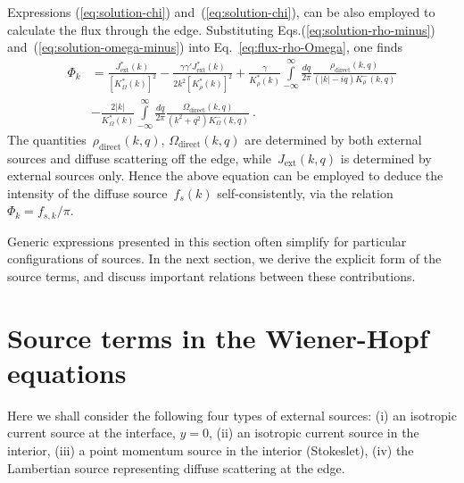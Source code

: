\documentclass[preprint,aps,eqsecnum]{revtex4-1}
\newcommand{\fminus}[1]{{#1}^{-}}
\newcommand{\dct}[1]{{#1}_\mathrm{direct}}
\begin{document}
Expressions (\ref{eq:solution-chi}) and~(\ref{eq:solution-chi}),
can be also  employed to calculate the flux through the edge. Substituting
Eqs.(\ref{eq:solution-rho-minus}) and~(\ref{eq:solution-omega-minus})
into Eq.~\ref{eq:flux-rho-Omega},
one finds
\begin{align}
  \label{eq:phi-general}
  \Phi_k &= \frac{J_\mathrm{ext}^\ast(k)}{\left[K_\Omega^\ast(k)\right]^2}
  - \frac{\gamma \gamma' J_\mathrm{ext}^\ast(k)}{2k^2 \left[K_\rho^\ast(k)\right]^2}
  + \frac{\gamma}{K_\rho^\ast(k)} \int\limits_{-\infty}^{\infty}
    \frac{dq}{2\pi}
  \frac{\dct{\rho}(k, q)}{(|k| - i q) \fminus{K}_\rho(k, q)}
  \nonumber
  \\
   &- \frac{2|k|}{K_\Omega^\ast(k)} \int\limits_{-\infty}^{\infty}
     \frac{dq}{2\pi}
     \frac{\dct{\Omega}(k, q)}{(k^2 + q^2)\fminus{K}_\Omega(k, q)}
    \ . 
\end{align}
The quantities~$\dct{\rho}(k, q)$, $\dct{\Omega}(k, q)$ are determined
by both external sources and diffuse scattering off the edge, 
while~$J_\mathrm{ext}(k, q)$ is determined by external sources only.
Hence the above equation can be employed to deduce the intensity
of the diffuse source~$f_s(k)$ self-consistently, via the relation
$\Phi_k = f_{s, k}/\pi$. 

Generic expressions presented in this section often simplify for particular
configurations of sources. In the next section, we derive the explicit
form of the source terms, and discuss important relations between
these contributions. 



\section{Source terms in the Wiener-Hopf equations}
\label{sec:sources}
Here we shall consider the following four
types of external sources: (i) an isotropic current source at the interface,
$y = 0$, (ii) an isotropic current source in the interior,
(iii) a point momentum source in the interior (Stokeslet), 
(iv) the Lambertian source representing diffuse scattering at the edge. 
\end{document}
